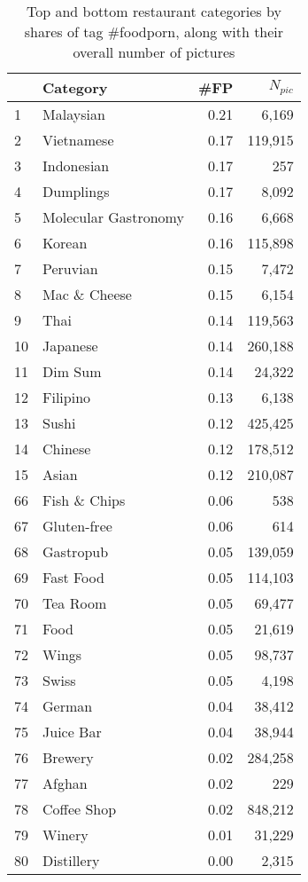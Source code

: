 \documentclass{sig-alternate-2013}
\begin{document}
\begin{table}[h]
\caption{Top and bottom restaurant categories by shares of tag \#foodporn, along with their overall number of pictures
\label{tbl:categoryfoodporn}}
\begin{center}
\footnotesize
\begin{tabular}{llrr}
\toprule
 & \textbf{Category} & \textbf{\#FP} & \textbf{$N_{pic}$} \\
\midrule
1 & Malaysian & 0.21 & 6,169 \\
2 & Vietnamese & 0.17 & 119,915 \\
3 & Indonesian & 0.17 & 257 \\
4 & Dumplings & 0.17 & 8,092 \\
5 & Molecular Gastronomy & 0.16 & 6,668 \\
6 & Korean & 0.16 & 115,898 \\
7 & Peruvian & 0.15 & 7,472 \\
8 & Mac \& Cheese & 0.15 & 6,154 \\
9 & Thai & 0.14 & 119,563 \\
10 & Japanese & 0.14 & 260,188 \\
11 & Dim Sum & 0.14 & 24,322 \\
12 & Filipino & 0.13 & 6,138 \\
13 & Sushi & 0.12 & 425,425 \\
14 & Chinese & 0.12 & 178,512 \\
15 & Asian & 0.12 & 210,087 \\
\midrule
66 & Fish \& Chips & 0.06 & 538 \\
67 & Gluten-free & 0.06 & 614 \\
68 & Gastropub & 0.05 & 139,059 \\
69 & Fast Food & 0.05 & 114,103 \\
70 & Tea Room & 0.05 & 69,477 \\
71 & Food & 0.05 & 21,619 \\
72 & Wings & 0.05 & 98,737 \\
73 & Swiss & 0.05 & 4,198 \\
74 & German & 0.04 & 38,412 \\
75 & Juice Bar & 0.04 & 38,944 \\
76 & Brewery & 0.02 & 284,258 \\
77 & Afghan & 0.02 & 229 \\
78 & Coffee Shop & 0.02 & 848,212 \\
79 & Winery & 0.01 & 31,229 \\
80 & Distillery & 0.00 & 2,315 \\
\bottomrule
\end{tabular}
\end{center}
\end{table}
\end{document}
